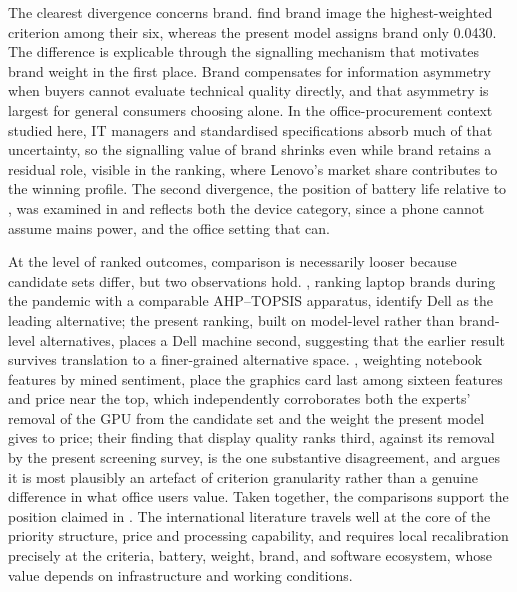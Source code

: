 The clearest divergence concerns brand. \textcite{sonmez_cakir_determination_2020} find
brand image the highest-weighted criterion among their six, whereas the present model
assigns brand only 0.0430. The difference is explicable through the signalling mechanism
that motivates brand weight in the first place. Brand compensates for information
asymmetry when buyers cannot evaluate technical quality directly, and that asymmetry is
largest for general consumers choosing alone. In the office-procurement context studied
here, IT managers and standardised specifications absorb much of that uncertainty, so the
signalling value of brand shrinks even while brand retains a residual role, visible in the
ranking, where Lenovo's market share contributes to the winning profile. The second
divergence, the position of battery life relative to
\textcite{weng_siew_lam_evaluation_2023}, was examined in  and
reflects both the device category, since a phone cannot assume mains power, and the
office setting that can.

At the level of ranked outcomes, comparison is necessarily looser because candidate sets
differ, but two observations hold. \textcite{gaur_application_2023}, ranking laptop brands
during the pandemic with a comparable AHP--TOPSIS apparatus, identify Dell as the leading
alternative; the present ranking, built on model-level rather than brand-level
alternatives, places a Dell machine second, suggesting that the earlier result survives
translation to a finer-grained alternative space. \textcite{maghsoudi_hybrid_2026},
weighting notebook features by mined sentiment, place the graphics card last among
sixteen features and price near the top, which independently corroborates both the
experts' removal of the GPU from the candidate set and the weight the present model gives
to price; their finding that display quality ranks third, against its removal by the
present screening survey, is the one substantive disagreement, and
 argues it is most plausibly an artefact of criterion
granularity rather than a genuine difference in what office users value. Taken together,
the comparisons support the position claimed in . The international
literature travels well at the core of the priority structure, price and processing
capability, and requires local recalibration precisely at the criteria, battery, weight,
brand, and software ecosystem, whose value depends on infrastructure and working
conditions.
